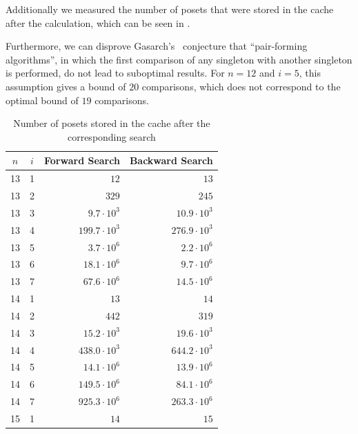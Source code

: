 \documentclass[twoside,leqno,twocolumn]{article}
\begin{document}
Additionally we measured the number of posets that were stored in the cache after the calculation, which can be seen in .

Furthermore, we can disprove Gasarch's~\cite{Gasarch1996} conjecture that ``pair-forming algorithms'', in which the first comparison of any singleton with another singleton is performed, do not lead to suboptimal results.
For $n = 12$ and $i = 5$, this assumption gives a bound of $20$ comparisons, which does not correspond to the optimal bound of $19$ comparisons.

\begin{table}[!t]
  \renewcommand{\arraystretch}{1.2}
  \caption{Number of posets stored in the cache after the corresponding search}
  \label{table:cache_entries}
  \centering
  \begin{tabular}{c|c|r|r}
    $n$ & $i$ & \textbf{Forward Search} & \textbf{Backward Search} \\
    \hline
    13  & 1   & $12$                    & $13$                     \\
    13  & 2   & $329$                   & $245$                    \\
    13  & 3   & $9.7 \cdot 10^3$        & $10.9 \cdot 10^3$        \\
    13  & 4   & $199.7 \cdot 10^3$      & $276.9 \cdot 10^3$       \\
    13  & 5   & $3.7 \cdot 10^6$        & $2.2 \cdot 10^6$         \\
    13  & 6   & $18.1 \cdot 10^6$       & $9.7 \cdot 10^6$         \\
    13  & 7   & $67.6 \cdot 10^6$       & $14.5 \cdot 10^6$        \\
    \hline
    14  & 1   & $13$                    & $14$                     \\
    14  & 2   & $442$                   & $319$                    \\
    14  & 3   & $15.2 \cdot 10^3$       & $19.6 \cdot 10^3$        \\
    14  & 4   & $438.0 \cdot 10^3$      & $644.2 \cdot 10^3$       \\
    14  & 5   & $14.1 \cdot 10^6$       & $13.9 \cdot 10^6$        \\
    14  & 6   & $149.5 \cdot 10^6$      & $84.1 \cdot 10^6$        \\
    14  & 7   & $925.3 \cdot 10^6$      & $263.3 \cdot 10^6$       \\
    \hline
    15  & 1   & $14$                    & $15$                     \\

\end{tabular}
\end{table}
\end{document}
